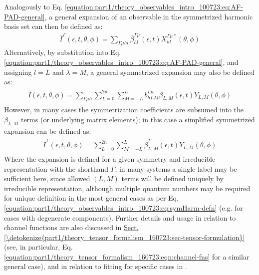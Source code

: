 \documentclass[letterpaper,table,10pt,english]{jupyterBook}
\begin{document}
\sphinxAtStartPar
Analogously to Eq. \eqref{equation:part1/theory_observables_intro_100723:eq:AF-PAD-general}, a general expansion of an observable in the symmetrized harmonic basis set can then be defined as:
\begin{equation}\label{equation:part1/theory_observables_intro_100723:eq:AF-PAD-general-symHarm}
\begin{split}
\bar{I}^{\Gamma}(\epsilon,t,\theta,\phi) = \sum_{\Gamma\mu hl}\bar{\beta}_{hl}^{\Gamma\mu}(\epsilon,t)X_{hl}^{\Gamma\mu*}(\theta,\phi)
\end{split}
\end{equation}
\sphinxAtStartPar
Alternatively, by substitution into Eq. \eqref{equation:part1/theory_observables_intro_100723:eq:AF-PAD-general}, and assigning \(l=L\) and \(\lambda=M\), a general symmetrized expansion may also be defined as:
\begin{equation}\label{equation:part1/theory_observables_intro_100723:eq:AF-PAD-general-symHarm-subs}
\begin{split}
\begin{align}
\bar{I}(\epsilon,t,\theta,\phi)=\sum_{\Gamma\mu h}\sum_{L=0}^{2n}\sum_{M=-L}^{L}b_{hLM}^{\Gamma\mu}\bar{\beta}_{L,M}(\epsilon,t)Y_{L,M}(\theta,\phi)
\end{align}
\end{split}
\end{equation}
\sphinxAtStartPar
However, in many cases the symmetrization coefficients are subsumed into the \(\beta_{L,M}\) terms (or underlying matrix elements); in this case a simplified symmetrized expansion can be defined as:
\begin{equation}\label{equation:part1/theory_observables_intro_100723:eq:AF-PAD-general-sym-betas}
\begin{split}
\begin{align}
\bar{I}^{\Gamma}(\epsilon,t,\theta,\phi)=\sum_{L=0}^{2n}\sum_{M=-L}^{L}\bar{\beta}^{\Gamma}_{L,M}(\epsilon,t)Y_{L,M}(\theta,\phi)
\end{align}
\end{split}
\end{equation}
\sphinxAtStartPar
Where the expansion is defined for a given symmetry and irreducible representation with the shorthand \(\Gamma\); in many systems a single label may be sufficient here, since allowed \((L,M)\) terms will be defined uniquely by irreducible representation, although multiple quantum numbers may be required for unique definition in the most general cases as per Eq. \eqref{equation:part1/theory_observables_intro_100723:eq:symHarm-defn} (e.g. for cases with degenerate components). Further details and usage in relation to channel functions are also discussed in \hyperref[\detokenize{part1/theory_tensor_formalism_160723:sec-tensor-formulation}]{Sect.\@ \ref{\detokenize{part1/theory_tensor_formalism_160723:sec-tensor-formulation}}} (see, in particular, Eq. \eqref{equation:part1/theory_tensor_formalism_160723:eqn:channel-fns} for a similar general case), and in relation to fitting for specific cases in {\hyperref[\detokenize{part2/extracting_matrix_elements_overview_270423:chpt-extracting-matrix-elements-overview}]{}}.
\end{document}
